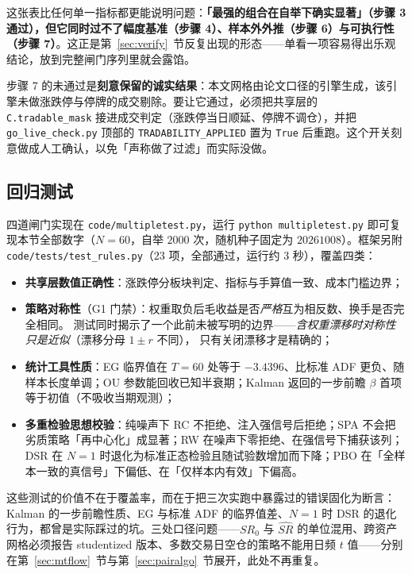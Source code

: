 这张表比任何单一指标都更能说明问题：\textbf{「最强的组合在自举下确实显著」（步骤 3 通过），但它同时过不了幅度基准（步骤 4）、样本外外推（步骤 6）与可执行性（步骤 7）}。这正是第~\ref{sec:verify}~节反复出现的形态——单看一项容易得出乐观结论，放到完整闸门序列里就会露馅。

步骤 7 的未通过是\textbf{刻意保留的诚实结果}：本文网格由论文口径的引擎生成，该引擎未做涨跌停与停牌的成交剔除。要让它通过，必须把共享层的 \texttt{C.tradable\_mask} 接进成交判定（涨跌停当日顺延、停牌不调仓），并把 \texttt{go\_live\_check.py} 顶部的 \texttt{TRADABILITY\_APPLIED} 置为 \texttt{True} 后重跑。这个开关刻意做成人工确认，以免「声称做了过滤」而实际没做。

\subsection{回归测试}

四道闸门实现在 \texttt{code/multipletest.py}，运行 \texttt{python multipletest.py} 即可复现本节全部数字（$N=60$，自举 $2000$ 次，随机种子固定为 $20261008$）。框架另附 \texttt{code/tests/test\_rules.py}（$23$ 项，全部通过，运行约 $3$ 秒），覆盖四类：

\begin{itemize}[leftmargin=2.2em]
  \item \textbf{共享层数值正确性}：涨跌停分板块判定、指标与手算值一致、成本门槛边界；
  \item \textbf{策略对称性}（G1 门禁）：权重取负后毛收益是否\emph{严格}互为相反数、换手是否完全相同。
        测试同时揭示了一个此前未被写明的边界——\emph{含权重漂移时对称性只是近似}（漂移分母 $1\pm r$ 不同），
        只有关闭漂移才是精确的；
  \item \textbf{统计工具性质}：EG 临界值在 $T=60$ 处等于 $-3.4396$、比标准 ADF 更负、随样本长度单调；OU 参数能回收已知半衰期；Kalman 返回的一步前瞻 $\beta$ 首项等于初值（不吸收当期观测）；
  \item \textbf{多重检验思想校验}：纯噪声下 RC 不拒绝、注入强信号后拒绝；SPA 不会把劣质策略「再中心化」成显著；RW 在噪声下零拒绝、在强信号下捕获该列；DSR 在 $N=1$ 时退化为标准正态检验且随试验数增加而下降；PBO 在「全样本一致的真信号」下偏低、在「仅样本内有效」下偏高。
\end{itemize}

这些测试的价值不在于覆盖率，而在于把三次实跑中暴露过的错误固化为断言：Kalman 的一步前瞻性质、EG 与标准 ADF 的临界值差、$N=1$ 时 DSR 的退化行为，都曾是实际踩过的坑。三处口径问题——$SR_0$ 与 $\widehat{SR}$ 的单位混用、跨资产网格必须报告 studentized 版本、多数交易日空仓的策略不能用日频 $t$ 值——分别在第~\ref{sec:mtflow}~节与第~\ref{sec:pairalgo}~节展开，此处不再重复。
